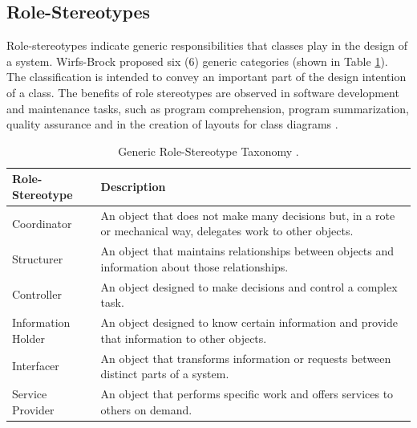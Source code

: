 \documentclass[AMA,Times1COL]{WileyNJDv5} %
\begin{document}
\subsection{Role-Stereotypes}
Role-stereotypes indicate generic responsibilities that classes play in the design of a system. Wirfs-Brock\cite{wirfs2006characterizing} proposed six (6) generic categories (shown in Table \ref{table:role-stereotype}). The classification is intended to convey an important part of the design intention of a class. The benefits of role stereotypes are observed in software development and maintenance tasks, such as program comprehension, program summarization, quality assurance and in the creation of layouts for class diagrams \cite{genero2008does, nurwidyantoro2019automated, sharif2009effect}.

\begin{table}[b]
	\centering %
	\caption{Generic Role-Stereotype Taxonomy \cite{wirfs2006characterizing, ho2022role}.} %
	\begin{tabular*}{\textwidth}{@{\extracolsep\fill}ll@{\extracolsep\fill}}%
		\toprule
		\textbf{Role-Stereotype} & \textbf{Description} \\ 
		\midrule
		Coordinator & An object that does not make many decisions but, in a rote or mechanical way, delegates work to other objects.\\ 
		Structurer & An object that maintains relationships between objects and information about those relationships. \\ 
		Controller & An object designed to make decisions and control a complex task.\\ 
			Information Holder  & An object designed to know certain information and provide that information to other objects. \\
		Interfacer & An object that transforms information or requests between distinct parts of a system. \\
		Service Provider & An object that performs specific work and offers services to others on demand.\\ 
		\bottomrule
	\end{tabular*}
	\label{table:role-stereotype} %
\end{table}
\end{document}

